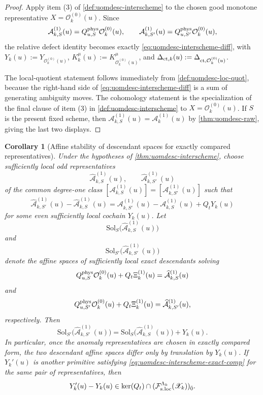 \documentclass[11pt]{article}
\theoremstyle{definition}
\theoremstyle{plain}
\newtheorem{corollary}[definition]{Corollary}
\theoremstyle{remark}
\newcommand{\Fsloc}{\mathcal F_{\rm s.loc}}
\newcommand{\Xscr}{\mathscr X}
\newcommand{\Ozero}{\mathcal O^{(0)}}
\newcommand{\Aone}{\mathcal A^{(1)}}
\newcommand{\Xione}{\Xi^{(1)}}
\newcommand{\Qt}{Q_t}
\begin{document}
\begin{proof}
Apply item (3) of \cref{def:uomdesc-interscheme} to the chosen good monotone representative
\(X=\Ozero_k(u)\).
Since
\[
\mathcal A_{k,S}^{(1)}(u)=Q_{u,S}^{\rm phys}\Ozero_k(u),
\qquad
\mathcal A_{k,S'}^{(1)}(u)=Q_{u,S'}^{\rm phys}\Ozero_k(u),
\]
the relative defect identity becomes exactly \eqref{eq:uomdesc-interscheme-diff}, with
\(
Y_k(u):=Y_{\Ozero_k(u)}
\),
\(
K_k^\mu(u):=K_{\Ozero_k(u)}^\mu
\),
and
\(
\Delta_{{\rm ct},k}(u):=\Delta_{{\rm ct},\Ozero_k(u)}
\).

The local-quotient statement follows immediately from \cref{def:uomdesc-loc-quot}, because the
right-hand side of \eqref{eq:uomdesc-interscheme-diff} is a sum of generating ambiguity moves.
The cohomology statement is the specialization of the final clause of item (3) in
\cref{def:uomdesc-interscheme} to \(X=\Ozero_k(u)\).
If \(S\) is the present fixed scheme, then
\(
\mathcal A_{k,S}^{(1)}(u)=\Aone_k(u)
\)
by \cref{thm:uomdesc-raw}, giving the last two displays.
\end{proof}

\begin{corollary}[Affine stability of descendant spaces for exactly compared representatives]
\label{cor:uomdesc-interscheme-desc}
Under the hypotheses of \cref{thm:uomdesc-interscheme}, choose sufficiently local odd
representatives
\[
\widehat{\mathcal A}_{k,S}^{(1)}(u),
\qquad
\widehat{\mathcal A}_{k,S'}^{(1)}(u)
\]
of the common degree-one class
\(
[\mathcal A_{k,S}^{(1)}(u)]=[\mathcal A_{k,S'}^{(1)}(u)]
\)
such that
\begin{equation}
\widehat{\mathcal A}_{k,S'}^{(1)}(u)-\widehat{\mathcal A}_{k,S}^{(1)}(u)
=
\mathcal A_{k,S'}^{(1)}(u)-\mathcal A_{k,S}^{(1)}(u)+\Qt Y_k(u)
\label{eq:uomdesc-interscheme-exact-comp}
\end{equation}
for some even sufficiently local cochain \(Y_k(u)\).
Let
\[
\mathrm{Sol}_{S}\big(\widehat{\mathcal A}_{k,S}^{(1)}(u)\big)
\]
and
\[
\mathrm{Sol}_{S'}\big(\widehat{\mathcal A}_{k,S'}^{(1)}(u)\big)
\]
denote the affine spaces of sufficiently local exact descendants solving
\[
Q_{u,S}^{\rm phys}\Ozero_k(u)+\Qt\Xione_k(u)=\widehat{\mathcal A}_{k,S}^{(1)}(u)
\]
and
\[
Q_{u,S'}^{\rm phys}\Ozero_k(u)+\Qt\Xione_k(u)=\widehat{\mathcal A}_{k,S'}^{(1)}(u),
\]
respectively.
Then
\[
\mathrm{Sol}_{S'}\big(\widehat{\mathcal A}_{k,S'}^{(1)}(u)\big)
=
\mathrm{Sol}_{S}\big(\widehat{\mathcal A}_{k,S}^{(1)}(u)\big)+Y_k(u).
\]
In particular, once the anomaly representatives are chosen in exactly compared form, the two
descendant affine spaces differ only by translation by \(Y_k(u)\).
If \(Y_k'(u)\) is another primitive satisfying \eqref{eq:uomdesc-interscheme-exact-comp} for the
same pair of representatives, then
\[
Y_k'(u)-Y_k(u)\in \ker(\Qt)\cap(\Fsloc^{\Lambda_k}(\Xscr_k))_{\bar 0}.
\]
\end{corollary}
\end{document}
